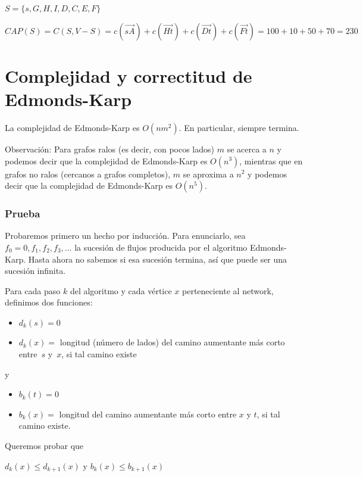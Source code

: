 \documentclass[10pt,a4paper]{article}
\begin{document}
$S= \{s, G, H, I, D, C, E, F\}$

$CAP(S) = C(S, V- S) = c(\overrightarrow{sA}) + c(\overrightarrow{Ht}) + c(\overrightarrow{Dt}) + c(\overrightarrow{Ft}) = 100 + 10 + 50 + 70 = 230$

\section*{Complejidad y correctitud de Edmonds-Karp}

La complejidad de Edmonds-Karp es $O(nm^2)$. En particular, siempre termina.

Observación: Para grafos ralos (es decir, con pocos lados) $m$ se acerca a $n$ y podemos decir que la complejidad de Edmonds-Karp es $O(n^3)$, mientras que en grafos no ralos (cercanos a grafos completos), $m$ se aproxima a $n^2$ y podemos decir que la complejidad de Edmonds-Karp es $O(n^5)$.

\subsubsection*{Prueba}

Probaremos primero un hecho por inducción. Para enunciarlo, sea $f_0 = 0, f_1, f_2, f_3, \dots$ la sucesión de flujos producida por el algoritmo Edmonds-Karp. Hasta ahora no sabemos si esa sucesión termina, así que puede ser una sucesión infinita.

Para cada paso $k$ del algoritmo y cada vértice $x$ perteneciente al network, definimos dos funciones:

\begin{itemize}

	\item $d_k(s) = 0$
	\item $d_k(x) = $ longitud (número de lados) del camino aumentante más corto entre $s$ y $x$, si tal camino existe
\end{itemize}

y

\begin{itemize}

	\item $b_k(t) = 0$
	\item $b_k(x) = $ longitud del camino aumentante más corto entre $x$ y $t$, si tal camino existe.
\end{itemize}

Queremos probar que

\begin{center}
$d_k(x) \leq d_{k+1}(x)$ y $b_k(x) \leq b_{k+1}(x)$
\end{center}
\end{document}
